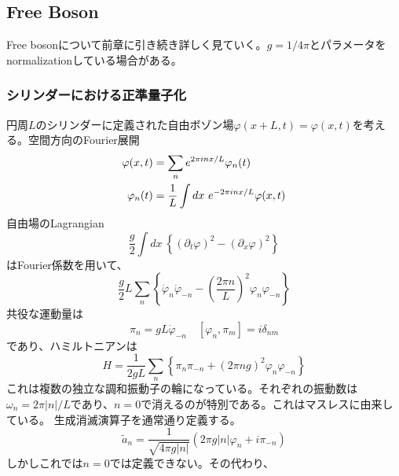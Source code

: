 \documentclass[11pt, aps, longbibliography]{article}
\numberwithin{equation}{section}
\begin{document}
    \subsection{Free Boson}
        Free bosonについて前章に引き続き詳しく見ていく。$g=1/4\pi$とパラメータをnormalizationしている場合がある。
        \subsubsection{シリンダーにおける正準量子化}
        円周$L$のシリンダーに定義された自由ボゾン場$\varphi(x+L,t)=\varphi(x,t)$を考える。空間方向のFourier展開
        \begin{align}\label{eq:freeboson1-1}
            \varphi(x,t) &= \sum_n e^{2\pi inx/L} \varphi_n(t) \\
            \varphi_n(t) &= \frac{1}{L}\int dx \ e^{-2\pi inx/L}\varphi(x,t) \notag 
        \end{align}
        自由場のLagrangian
        \begin{equation}\label{eq:freeboson1-2}
            \frac{g}{2}\int dx \ \left\{ (\partial_t \varphi)^2 - (\partial_x \varphi)^2 \right\}
        \end{equation}
        はFourier係数を用いて、
        \begin{equation}\label{eq:freeboson1-3}
            \frac{g}{2}L \sum_{n}\left\{ \dot{\varphi}_n \dot{\varphi}_{-n} - \left( \frac{2\pi n}{L} \right)^2 \varphi_n \varphi_{-n}  \right\}
        \end{equation}
        共役な運動量は
        \begin{equation}\label{eq:freeboson1-4}
            \pi_n = gL\dot{\varphi}_{-n} \quad [\varphi_n, \pi_m] = i\delta_{nm}
        \end{equation}
        であり、ハミルトニアンは
        \begin{equation}\label{eq:freeboson1-5}
            H = \frac{1}{2gL}\sum_{n}\left\{ \pi_n \pi_{-n} + (2\pi ng)^2 \varphi_n \varphi_{-n} \right\}
        \end{equation}
        これは複数の独立な調和振動子の輪になっている。それぞれの振動数は$\omega_n = 2\pi|n|/L$であり、$n=0$で消えるのが特別である。これはマスレスに由来している。
        生成消滅演算子を通常通り定義する。
        \begin{equation}\label{eq:freeboson1-6}
            \tilde{a}_n = \frac{1}{\sqrt{4\pi g|n|}}\left( 2\pi g |n|\varphi_n + i\pi_{-n} \right)
        \end{equation}
        しかしこれでは$n=0$では定義できない。その代わり、
\end{document}
